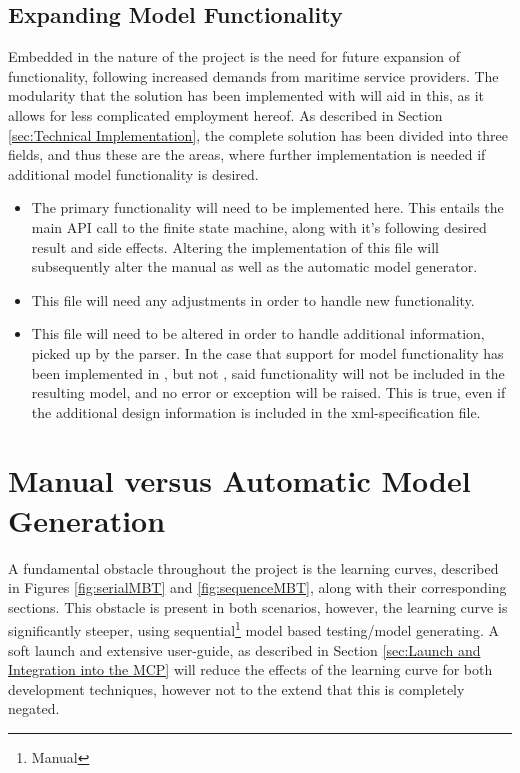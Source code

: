 \subsection{Expanding Model Functionality}
Embedded in the nature of the project is the need for future expansion of functionality, following increased demands from maritime service providers. The modularity that the solution has been implemented with will aid in this, as it allows for less complicated employment hereof. As described in Section \ref{sec:Technical Implementation}, the complete solution has been divided into three fields, and thus these are the areas, where further implementation is needed if additional model functionality is desired.
\begin{itemize}
  \item {}
    The primary functionality will need to be implemented here. This entails the main API call to the finite state machine, along with it's following desired result and side effects. Altering the implementation of this file will subsequently alter the manual as well as the automatic model generator.
  \item {}
    This file will  need any adjustments in order to handle new functionality.
  \item {}
    This file will need to be altered in order to handle additional information, picked up by the parser. In the case that support for model functionality has been implemented in , but not , said functionality will not be included in the resulting model, and no error or exception will be raised. This is true, even if the additional design information is included in the xml-specification file.
\end{itemize}

\section{Manual versus Automatic Model Generation}
A fundamental obstacle throughout the project is the learning curves, described in Figures \ref{fig:serialMBT} and \ref{fig:sequenceMBT}, along with their corresponding sections. This obstacle is present in both scenarios, however, the learning curve is significantly steeper, using sequential\footnote{Manual} model based testing/model generating. A soft launch and extensive user-guide, as described in Section \ref{sec:Launch and Integration into the MCP} will reduce the effects of the learning curve for both development techniques, however not to the extend that this is completely negated.

